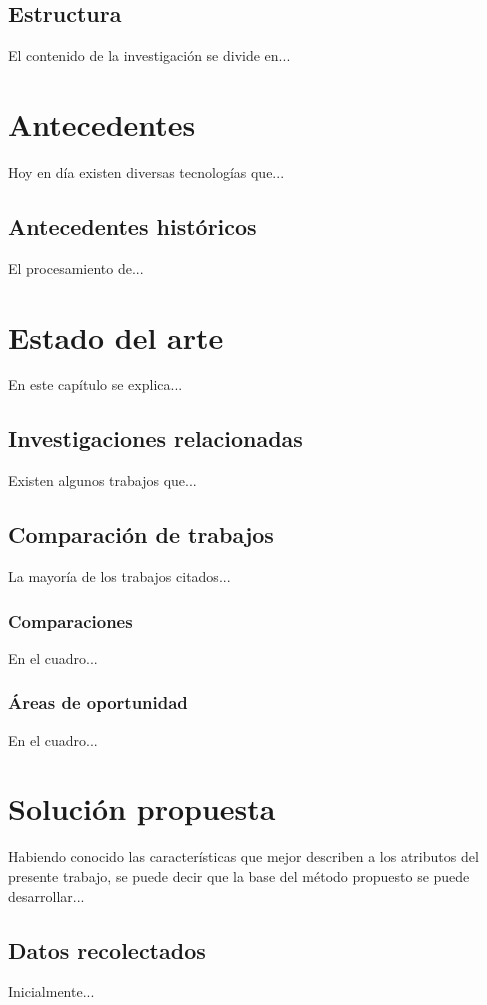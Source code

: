 \section{Estructura}
El contenido de la investigación se divide en...


\chapter{Antecedentes}
Hoy en día existen diversas tecnologías que...

\section{Antecedentes históricos}
El procesamiento de...


\chapter{Estado del arte}
En este capítulo se explica...

\section{Investigaciones relacionadas}
Existen algunos trabajos que...

\section{Comparación de trabajos}
La mayoría de los trabajos citados...

\subsection{Comparaciones}
En el cuadro...

\subsection{Áreas de oportunidad}
En el cuadro...


\chapter{Solución propuesta}
Habiendo conocido las características que mejor describen a los atributos del presente trabajo, se puede decir que la base del método propuesto se puede desarrollar...

\section{Datos recolectados}
Inicialmente...



